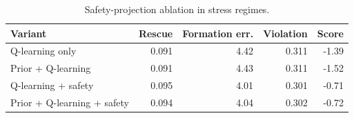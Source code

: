 \begin{table}[t]
  \centering
  \caption{Safety-projection ablation in stress regimes.}
  \label{tab:safety_ablation}
  \begin{tabular}{lrrrr}
    \toprule
    Variant & Rescue & Formation err. & Violation & Score \\
    \midrule
    Q-learning only & 0.091 & 4.42 & 0.311 & -1.39 \\
    Prior + Q-learning & 0.091 & 4.43 & 0.311 & -1.52 \\
    Q-learning + safety & 0.095 & 4.01 & 0.301 & -0.71 \\
    Prior + Q-learning + safety & 0.094 & 4.04 & 0.302 & -0.72 \\
    \bottomrule
  \end{tabular}
\end{table}
